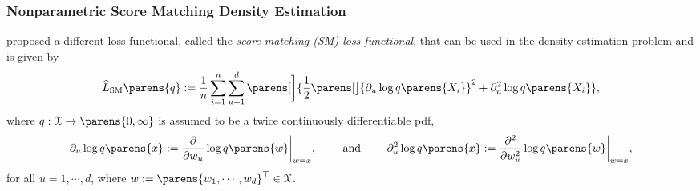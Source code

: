 %	


\subsubsection{Nonparametric Score Matching Density Estimation}\label{subsection-nonpara-scorematching}

\textcite{Hyvarinen2005-wp} proposed a different loss functional, called the \textit{score matching (SM) loss functional}, that can be used in the density estimation problem and is given by 
\begin{align}\label{eq-sm-loss}
	\widehat{L}_{\SM} \parens{q} := \frac{1}{n} \sum_{i=1}^n \sum_{u=1}^d \parens[\bigg]{\frac{1}{2} \parens[\big]{\partial_u \log q \parens{X_i}}^2 + \partial_u^2 \log q \parens{X_i}}, 
\end{align}
where $q: \calX \to \parens{0, \infty}$ is assumed to be a twice continuously differentiable pdf, 
\begin{align*}
	\partial_u \log q \parens{x} := \frac{\partial}{\partial w_u} \log q \parens{w} \bigg\vert_{w = x}, \qquad \text{ and } \qquad \partial_u^2 \log q \parens{x} := \frac{\partial^2}{\partial w_u^2} \log q \parens{w} \bigg\vert_{w = x}, 
\end{align*}
for all $u = 1, \cdots, d$, where $w := \parens{w_1, \cdots, w_d}^\top \in \calX$. 

